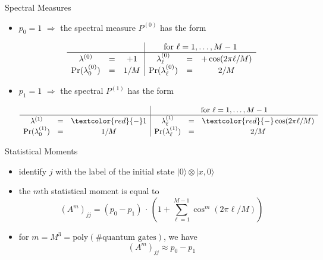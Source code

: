 \documentclass[slideColor]{prosper}
\renewcommand{\>}{\rangle}
\newcommand{\<}{\langle}
\begin{document}

\begin{slide}{Spectral Measures}

\begin{itemize}
\item $p_0=1$ $\Rightarrow$ the spectral measure $P^{(0)}$ has the form

\[
\begin{array}{ccc|ccc}
&&& \multicolumn{3}{c}{\mbox{for $\ell=1,\ldots,M-1$}}                                \\ \hline 
\lambda^{(0)}           & = & +1   & \lambda^{(0)}_\ell      & = & +\cos(2\pi \ell / M) \\
\Pr(\lambda^{(0)}_0)    & = & 1/M & \Pr(\lambda^{(0)}_\ell) & = & 2/M                 \\
\end{array}
\]

\medskip
\item $p_1=1$ $\Rightarrow$ the spectral $P^{(1)}$ has the form

\[
\begin{array}{ccc|ccc}
&&& \multicolumn{3}{c}{\mbox{for $\ell=1,\ldots,M-1$}}                                \\ \hline 
\lambda^{(1)}           & = & \textcolor{red}{-}1   & \lambda^{(1)}_\ell      & = & \textcolor{red}{-}\cos(2\pi \ell / M) \\
\Pr(\lambda^{(1)}_0)    & = & 1/M & \Pr(\lambda^{(1)}_\ell) & = & 2/M                 \\
\end{array}
\]
\end{itemize}

\end{slide}


\begin{slide}{Statistical Moments}

\begin{itemize}
\item identify $j$ with the label of the initial state $|0\>\otimes |x,0\>$

\medskip
\item the $m$th statistical moment is equal to 
\[
(A^m)_{jj} = (p_0 - p_1) \, \cdot \, \left(
1 + \sum_{\ell=1}^{M-1} \cos^{m}(2\pi \ell/M)
\right)
\]

\medskip 
\item for $m=M^3=\mathrm{poly}(\mbox{\# quantum gates})$, we have
\[
(A^m)_{jj} \approx p_0 - p_1 
\]

\end{itemize}

\end{slide}
\end{document}
